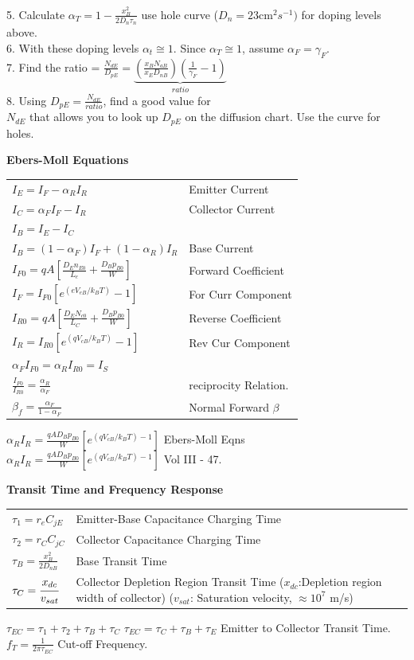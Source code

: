 \begin{multicols}{3}
\begin{flushright}
5. Calculate $\alpha_T=1-\frac{x_B^2}{2D_n \tau_n}$ use hole curve ($D_n=23 \text{cm}^2 s^{-1})$ for doping levels above. \\
6. With these doping levels $\alpha_t \cong 1$. Since $\alpha_T \cong 1$, assume $\alpha_F = \gamma_F$. \\
7. Find the ratio = $\frac{N_{dE}}{D_{pE}} = \underbrace{\left(\frac{x_BN_{aB}}{x_ED_{nB}}\right)\left(\frac{1}{\gamma_F}-1\right)}_{ratio}$ \\
8. Using $D_{pE}=\frac{N_{dE}}{ratio}$, find a good value for \\
$N_{dE}$ that allows you to look up $D_{pE}$ on the diffusion chart. Use the curve for holes.
\end{flushright}

\textbf{Ebers-Moll Equations}
\hfill \break 
\begin{tabular}{p{4.8cm}p{4cm}}
$I_E=I_F-\alpha_RI_R$ & Emitter Current \\
$I_C=\alpha_FI_F-I_R$ & Collector Current \\
$I_B=I_E-I_C$ \\
$I_B=(1-\alpha_F)I_F+(1-\alpha_R)I_R $& Base Current \\
$I_{F0}=qA \left[\frac{D_En_{E0}}{L_e}+\frac{D_Bp_{B0}}{W}\right]$ & Forward Coefficient \\
$I_F=I_{F0} \left[e^{(eV_{eB}/k_BT)}-1\right]$ & For Curr Component \\
$I_{R0}=qA \left[\frac{D_E N_{c0}}{L_C}+\frac{D_Bp_{B0}}{W}\right]$ & Reverse Coefficient \\
$I_R=I_{R0}\left[e^{(qV_{cB}/k_BT)}-1\right]$& Rev Cur Component \\
$\alpha_FI_{F0}=\alpha_R I_{R0}=I_S$ \\ $\frac{I_{F0}}{I_{R0}}=\frac{\alpha_R}{\alpha_F}$ & reciprocity Relation. \\
$\beta_f = \frac{\alpha_F}{1-\alpha_F}$ & Normal Forward $\beta$
\end{tabular}
$\alpha_R I_R = \frac{qAD_Bp_{B0}}{W} \left[ e^{(qV_{cB}/k_BT)-1}\right]$  Ebers-Moll Eqns \\

$\alpha_R I_R = \frac{qAD_Bp_{B0}}{W} \left[ e^{(qV_{cB}/k_BT)-1}\right]$ Vol III - 47.

\textbf{Transit Time and Frequency Response} \hfill \break
\begin{tabular}{p{1.75cm}p{7.05cm}}
$\tau_1=r_e C_{jE}$ & Emitter-Base Capacitance Charging Time \\
$\tau_2=r_CC_{jC}$ & Collector Capacitance Charging Time \\
$\tau_B=\frac{x_B^2}{2D_{nB}}$ & Base Transit Time \\
$\tau_C = \cfrac{x_{dc}}{v_{sat}}$ & Collector Depletion Region Transit Time \hfill \break ($x_{dc}$:Depletion region width of collector) \hfill \break ($v_{sat}$: Saturation velocity, $\approx 10^7$ m/s)
\end{tabular}
$\tau_{EC}=\tau_1+\tau_2+\tau_B+\tau_C$ $\tau_{EC}=\tau_C+\tau_B+\tau_E$ \hfill \break Emitter to Collector Transit Time.  $f_T = \frac{1}{2 \pi \tau_{EC}}$ Cut-off Frequency.


\end{multicols}
